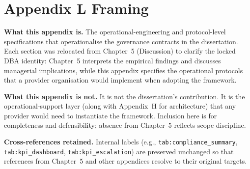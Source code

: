 
\section*{Appendix L Framing}
\label{sec:appl_framing}

\noindent\textbf{What this appendix is.} The operational-engineering and protocol-level
specifications that operationalise the governance contracts in the dissertation. Each
section was relocated from Chapter~5 (Discussion) to clarify the locked DBA identity:
Chapter~5 interprets the empirical findings and discusses managerial implications, while
this appendix specifies the operational protocols that a provider organisation would
implement when adopting the framework.

\noindent\textbf{What this appendix is not.} It is not the dissertation's contribution.
It is the operational-support layer (along with Appendix~H for architecture) that any
provider would need to instantiate the framework. Inclusion here is for completeness and
defensibility; absence from Chapter~5 reflects scope discipline.

\noindent\textbf{Cross-references retained.} Internal labels (e.g., \texttt{tab:compliance\_\allowbreak summary},
\texttt{tab:kpi\_\allowbreak dashboard}, \texttt{tab:kpi\_\allowbreak escalation}) are preserved unchanged so that
references from Chapter~5 and other appendices resolve to their original targets.

